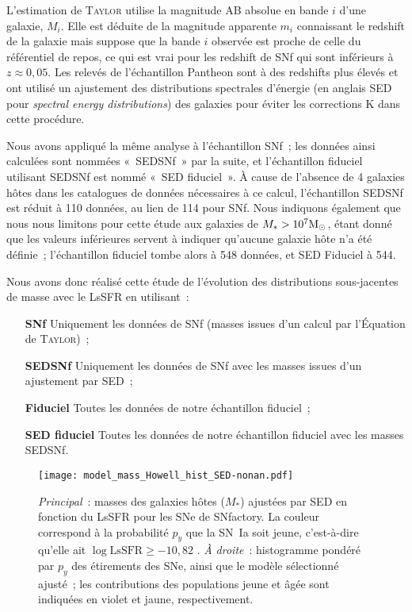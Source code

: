 \documentclass[../main/main.tex]{subfiles}
\begin{document}
L'estimation de \textsc{Taylor} utilise la magnitude AB absolue en bande $i$
d'une galaxie, $M_i$. Elle est déduite de la magnitude apparente $m_i$
connaissant le redshift de la galaxie mais suppose que la bande $i$ observée est
proche de celle du référentiel de repos, ce qui est vrai pour les redshift de
SNf qui sont inférieurs à $z\approx 0,05$. Les relevés de l'échantillon Pantheon
sont à des redshifts plus élevés et ont utilisé un ajustement des distributions
spectrales d'énergie (en anglais SED pour \textit{spectral energy
distributions}) des galaxies pour éviter les corrections K dans cette procédure.

Nous avons appliqué la même analyse à l'échantillon SNf~; les données ainsi
calculées sont nommées «~SEDSNf~» par la suite, et l'échantillon fiduciel
utilisant SEDSNf est nommé «~SED fiduciel~». À cause de l'absence de 4 galaxies
hôtes dans les catalogues de données nécessaires à ce calcul, l'échantillon
SEDSNf est réduit à 110 données, au lien de 114 pour SNf. Nous indiquons
également que nous nous limitons pour cette étude aux galaxies de $M_* >
10^7\si{\Msun}$, étant donné que les valeurs inférieures servent à indiquer
qu'aucune galaxie hôte n'a été définie~; l'échantillon fiduciel tombe alors à
548 données, et SED Fiduciel à 544.

Nous avons donc réalisé cette étude de l'évolution des distributions
sous-jacentes de masse avec le LsSFR en utilisant~:
\begin{enumerate}
    \item [\bfseries SNf] Uniquement les données de SNf (masses issues d'un
        calcul par l'Équation de \textsc{Taylor})~;
    \item [\bfseries SEDSNf] Uniquement les données de SNf avec les masses
        issues d'un ajustement par SED~;
    \item [\bfseries Fiduciel] Toutes les données de notre échantillon
        fiduciel~;
    \item [\bfseries SED fiduciel] Toutes les données de notre échantillon
        fiduciel avec les masses SEDSNf.
\end{enumerate}

\begin{figure}[t]
    \centering
    \texttt{[image: model\_mass\_Howell\_hist\_SED-nonan.pdf]}
    \caption[$M_*$ en fonction du LsSFR des SNe~Ia de SNfactory et modèle de
    masse sélectionné ajusté]{\textit{Principal}~: masses des galaxies hôtes
        ($M_*$) ajustées par SED en fonction du LsSFR pour les SNe de SNfactory.
        La couleur correspond à la probabilité $p_y$ que la SN~Ia soit jeune,
        c'est-à-dire qu'elle ait $\log \mathrm{LsSFR} \geq -10,82$
        \citep[voir][et Chapitre~\ref{ch:stretch}]{rigault2020}. \textit{À
        droite}~: histogramme pondéré par $p_y$ des étirements des SNe, ainsi
        que le modèle sélectionné ajusté~; les contributions des populations
    jeune et âgée sont indiquées en violet et jaune, respectivement.}
    \label{fig:massmodel}
\end{figure}
\end{document}
